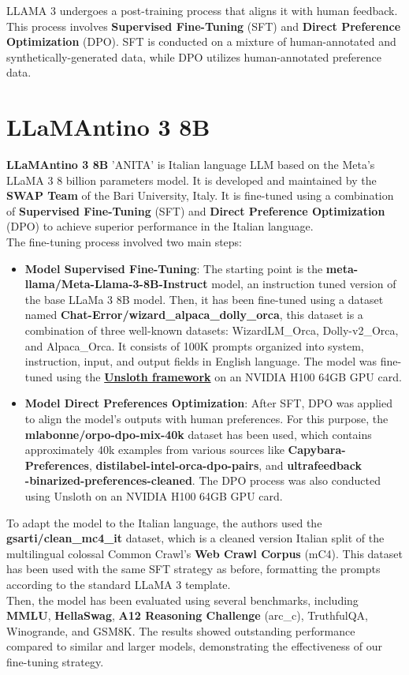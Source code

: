 \documentclass{article}
\begin{document}
		LLAMA 3 undergoes a post-training process that aligns it with human feedback.
		This process involves \textbf{Supervised Fine-Tuning} (SFT) and \textbf{Direct Preference Optimization} (DPO). SFT is conducted on a mixture of human-annotated and synthetically-generated data, while DPO utilizes human-annotated preference data.
		
	\section{LLaMAntino 3 8B}
	\textbf{LLaMAntino 3 8B} 'ANITA' \cite{polignano2024advanced} is Italian language LLM based on the Meta's LLaMA 3 8 billion parameters model. It is developed and maintained by the \textbf{SWAP Team} of the Bari University, Italy. It is fine-tuned using a combination of \textbf{Supervised Fine-Tuning} (SFT) and \textbf{Direct Preference Optimization} (DPO) to achieve superior performance in the Italian language. \\
	The fine-tuning process involved two main steps: 
	
	\begin{itemize}
		\item 
			\textbf{Model Supervised Fine-Tuning}: The starting point is the \textbf{meta-llama/Meta-Llama-3-8B-Instruct} model, an instruction tuned version of the base LLaMa 3 8B model. 
			Then, it has been fine-tuned using a dataset named \textbf{Chat-Error/wizard\_alpaca\_dolly\_orca}, this dataset is a combination of three well-known datasets: WizardLM\_Orca, Dolly-v2\_Orca, and Alpaca\_Orca. 
			It consists of 100K prompts organized into system, instruction, input, and output fields in English language.	The model was fine-tuned using the \href{https://docs.unsloth.ai/}{\textbf{Unsloth framework}} on an NVIDIA H100 64GB GPU card.
		
		\item 
			\textbf{Model Direct Preferences Optimization}: After SFT, DPO was applied to align the model's outputs with human preferences. For this purpose, the \textbf{mlabonne/orpo-dpo-mix-40k} dataset has been used, which contains approximately 40k examples from various sources like \textbf{Capybara-Preferences}, \textbf{distilabel-intel-orca-dpo-pairs}, and \textbf{ultrafeedback\\-binarized-preferences-cleaned}.
			The DPO process was also conducted using Unsloth on an NVIDIA H100 64GB GPU card.
	\end{itemize}
	
	To adapt the model to the Italian language, the authors used the \textbf{gsarti/clean\_mc4\_it} dataset, which is a cleaned version Italian split of the multilingual colossal Common Crawl's \textbf{Web Crawl Corpus} (mC4).
	This dataset has been used with the same SFT strategy as before, formatting the prompts according to the standard LLaMA 3 template. \\
	Then, the model has been evaluated using several benchmarks, including \textbf{MMLU}, \textbf{HellaSwag},\textbf{ A12 Reasoning Challenge} (arc\_c), TruthfulQA, Winogrande, and GSM8K. 
	The results showed outstanding performance compared to similar and larger models, demonstrating the effectiveness of our fine-tuning strategy.
	
\end{document}

